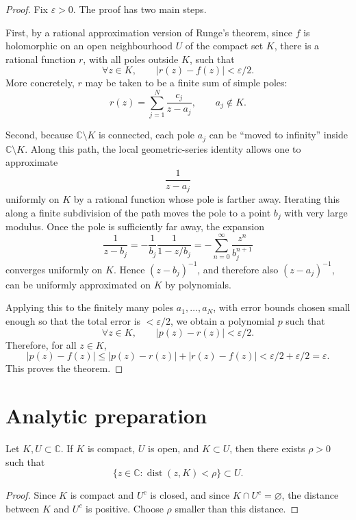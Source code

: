 \documentclass[a4paper]{article}
\newcommand{\C}{\mathbb{C}}
\newcommand{\eps}{\varepsilon}
\newcommand{\dist}{\operatorname{dist}}
\begin{document}
\begin{proof}
Fix \(\eps > 0\). The proof has two main steps.

First, by a rational approximation version of Runge's theorem, since \(f\) is
holomorphic on an open neighbourhood \(U\) of the compact set \(K\), there is a
rational function \(r\), with all poles outside \(K\), such that
\[
  \forall z \in K,\qquad |r(z)-f(z)| < \eps/2 .
\]
More concretely, \(r\) may be taken to be a finite sum of simple poles:
\[
  r(z) = \sum_{j=1}^N \frac{c_j}{z-a_j},
  \qquad a_j \notin K .
\]

Second, because \(\C \setminus K\) is connected, each pole \(a_j\) can be
``moved to infinity'' inside \(\C \setminus K\). Along this path, the local
geometric-series identity allows one to approximate
\[
  \frac{1}{z-a_j}
\]
uniformly on \(K\) by a rational function whose pole is farther away. Iterating
this along a finite subdivision of the path moves the pole to a point \(b_j\)
with very large modulus. Once the pole is sufficiently far away, the expansion
\[
  \frac{1}{z-b_j}
  =
  -\frac{1}{b_j}\frac{1}{1-z/b_j}
  =
  -\sum_{n=0}^{\infty} \frac{z^n}{b_j^{n+1}}
\]
converges uniformly on \(K\). Hence \((z-b_j)^{-1}\), and therefore also
\((z-a_j)^{-1}\), can be uniformly approximated on \(K\) by polynomials.

Applying this to the finitely many poles \(a_1,\dots,a_N\), with error bounds
chosen small enough so that the total error is \(<\eps/2\), we obtain a
polynomial \(p\) such that
\[
  \forall z \in K,\qquad |p(z)-r(z)| < \eps/2 .
\]
Therefore, for all \(z \in K\),
\[
  |p(z)-f(z)|
  \le |p(z)-r(z)| + |r(z)-f(z)|
  < \eps/2+\eps/2
  = \eps .
\]
This proves the theorem.
\end{proof}

\section{Analytic preparation}

\begin{lemma}
\label{lem:compact_subset_open_collar}
Let \(K,U \subset \C\). If \(K\) is compact, \(U\) is open, and \(K \subset U\),
then there exists \(\rho > 0\) such that
\[
  \{z \in \C : \dist(z,K) < \rho\} \subset U .
\]
\end{lemma}

\begin{proof}
Since \(K\) is compact and \(U^c\) is closed, and since \(K \cap U^c=\varnothing\),
the distance between \(K\) and \(U^c\) is positive. Choose \(\rho\) smaller than
this distance.
\end{proof}
\end{document}
